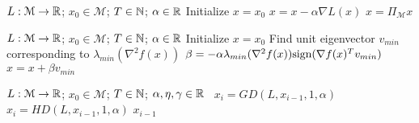 %
\begin{algorithm}[hb]
 \caption{$x = GD(L,x_0, T,\alpha$)}
   \label{GD}
\begin{algorithmic}
    $L: \mathcal{M} \to {\mathbb{R}}$; $x_0 \in \mathcal{M}$; $T\in {\mathbb{N}}$; $\alpha\in {\mathbb{R}}$
   \State Initialize $x = x_0$
   \State $x = x - \alpha\nabla L(x)$
   \State $x = \Pi_\mathcal{M} x$
   \EndFor
\end{algorithmic}
\end{algorithm}
%
\begin{algorithm}[hb]
 \caption{$x = HD(L,x_0, T,\alpha$)}
   \label{HD}
\begin{algorithmic}
    $L: \mathcal{M} \to {\mathbb{R}}$; $x_0 \in \mathcal{M}$; $T\in {\mathbb{N}}$; $\alpha \in {\mathbb{R}}$
   \State Initialize $x = x_0$
   \State Find unit eigenvector $v_{min}$ corresponding to $\lambda_{min}(\nabla^2 f(x))$ 
   \State  $\beta = -\alpha \lambda_{min}(\nabla^2 f(x)) \text{sign}(\nabla f(x)^Tv_{min}) $
    \State $x = x + \beta v_{min}$
   \EndFor
\end{algorithmic}
\end{algorithm}
%
\begin{algorithm}[hb]
 \caption{$x = SecondGD(L, x_0, T,\alpha, \eta, \gamma)$}
   \label{SecondGD}
\begin{algorithmic}
    $L:\mathcal{M} \to {\mathbb{R}}$; $x_0 \in
   \mathcal{M}$; $T\in {\mathbb{N}}$; $\alpha, \eta, \gamma \in {\mathbb{R}}$
   \  $x_{i} = GD(L, x_{i-1}, 1, \alpha)$
   \Else \
$x_i = HD(L, x_{i-1}, 1, \alpha)$ 
  \EndIf
     \Return $x_{i-1}$
   \EndIf 
   \EndFor
   \end{algorithmic}
%
\end{algorithm}
